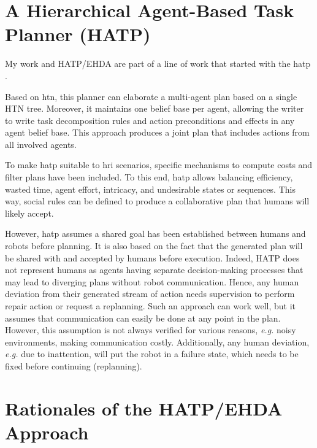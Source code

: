 \section{A Hierarchical Agent-Based Task Planner (HATP)}

My work and HATP/EHDA are part of a line of work that started with the \acrfull{hatp} \cite{alili2009task,lallement2014hatp}.

Based on \acrfull{htn}, this planner can elaborate a multi-agent plan based on a single HTN tree. Moreover, it maintains one belief base per agent, allowing the writer to write task decomposition rules and action preconditions and effects in any agent belief base. This approach produces a joint plan that includes actions from all involved agents. 

To make \acrshort{hatp} suitable to \acrshort{hri} scenarios, specific mechanisms to compute costs and filter plans have been included. To this end, \acrshort{hatp} allows balancing efficiency, wasted time, agent effort, intricacy, and undesirable states or sequences. This way, social rules can be defined to produce a collaborative plan that humans will likely accept. 

However, \acrshort{hatp} assumes a shared goal has been established between humans and robots before planning. It is also based on the fact that the generated plan will be shared with and accepted by humans before execution. Indeed, HATP does not represent humans as agents having separate decision-making processes that may lead to diverging plans without robot communication. Hence, any human deviation from their generated stream of action needs supervision to perform repair action or request a replanning. Such an approach can work well, but it assumes that communication can easily be done at any point in the plan. However, this assumption is not always verified for various reasons, \textit{e.g.} noisy environments, making communication costly.
Additionally, any human deviation, \textit{e.g.} due to inattention, will put the robot in a failure state, which needs to be fixed before continuing (replanning).

\section{Rationales of the HATP/EHDA Approach}

